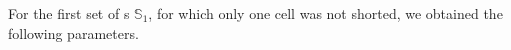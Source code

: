 For the first set of \BHSC s $\mathbb{S}_1$, for which only one cell was not shorted, we obtained the following parameters.
